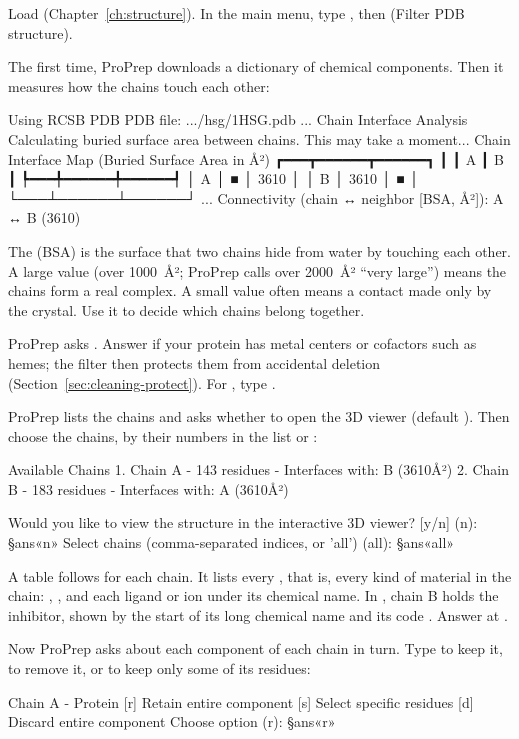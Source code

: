 \begin{steps}
  \item Load  (Chapter~\ref{ch:structure}). In the main menu, type
        , then  (Filter PDB structure).
  \item The first time, ProPrep downloads a dictionary of chemical
        components. Then it measures how the chains touch each
        other:
\begin{screen}
Using RCSB PDB PDB file: .../hsg/1HSG.pdb
...
Chain Interface Analysis
Calculating buried surface area between chains. This may take a moment...
Chain Interface Map
  (Buried Surface
    Area in Å²)
┏━━━┳━━━━━━┳━━━━━━┓
┃   ┃  A   ┃  B   ┃
┡━━━╇━━━━━━╇━━━━━━┩
│ A │  ■   │ 3610 │
│ B │ 3610 │  ■   │
└───┴──────┴──────┘
...
Connectivity (chain ↔ neighbor [BSA, Å²]):
  A ↔ B (3610)
\end{screen}
        The  (BSA) is the surface that two chains
        hide from water by touching each other. A large value (over
        1000~Å²; ProPrep calls over 2000~Å² ``very large'') means the chains
        form a real complex. A small value often means a contact made only by
        the crystal. Use it to decide which chains belong together.
  \item ProPrep asks
        . Answer
         if your protein has metal centers or cofactors such as hemes;
        the filter then protects them from accidental deletion
        (Section~\ref{sec:cleaning-protect}). For , type .
  \item ProPrep lists the chains and asks whether to open the 3D viewer
        (default ). Then choose the chains, by their numbers in the
        list or :
\begin{screen}
Available Chains
1. Chain A - 143 residues - Interfaces with: B (3610Å²)
2. Chain B - 183 residues - Interfaces with: A (3610Å²)

Would you like to view the structure in the interactive 3D viewer? [y/n] (n):
§ans«n»
Select chains (comma-separated indices, or 'all') (all): §ans«all»
\end{screen}
  \item A  table follows for each chain. It lists
        every , that is, every kind of material in the chain:
        , , and each ligand or ion under its
        chemical name. In , chain B holds the inhibitor, shown by the
        start of its long chemical name
         and its code
        . Answer  at
        .
  \item Now ProPrep asks about each component of each chain in turn. Type
         to keep it,  to remove it, or  to keep only some
        of its residues:
\begin{screen}
Chain A - Protein
[r] Retain entire component
[s] Select specific residues
[d] Discard entire component
Choose option (r): §ans«r»


\end{screen}
\end{steps}
